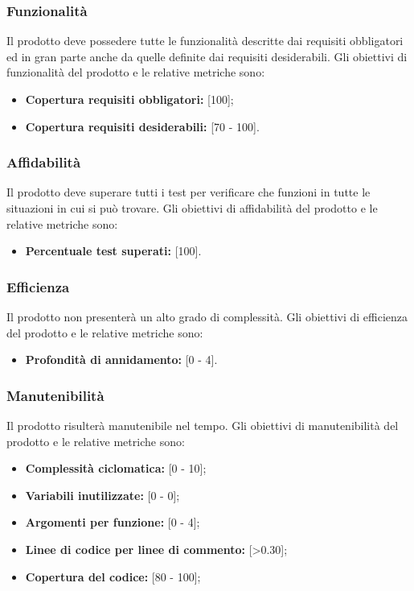 \subsubsection{Funzionalità} Il prodotto deve possedere tutte le funzionalità descritte dai requisiti obbligatori ed in gran parte anche da quelle definite dai requisiti desiderabili. Gli obiettivi di funzionalità del prodotto e le relative metriche sono:
\begin{itemize}
\item \textbf{Copertura requisiti obbligatori: }[100];
\item \textbf{Copertura requisiti desiderabili: }[70 - 100].
\end{itemize}

\subsubsection{Affidabilità} Il prodotto deve superare tutti i test per verificare che funzioni in tutte le situazioni in cui si può trovare.
Gli obiettivi di affidabilità del prodotto e le relative metriche sono:
\begin{itemize}
\item \textbf{Percentuale test superati: }[100].
\end{itemize}

\subsubsection{Efficienza} Il prodotto non presenterà un alto grado di complessità. 
Gli obiettivi di efficienza del prodotto e le relative metriche sono:
\begin{itemize}
\item \textbf{Profondità di annidamento: }[0 - 4].
\end{itemize}

\subsubsection{Manutenibilità} Il prodotto risulterà manutenibile nel tempo. 
Gli obiettivi di manutenibilità del prodotto e le relative metriche sono:
\begin{itemize}
\item \textbf{Complessità ciclomatica: }[0 - 10];
\item \textbf{Variabili inutilizzate: }[0 - 0];
\item \textbf{Argomenti per funzione: }[0 - 4];
\item \textbf{Linee di codice per linee di commento: }[>0.30];
\item \textbf{Copertura del codice: }[80 - 100];
\end{itemize}



